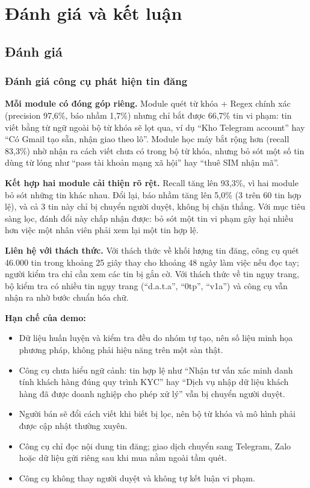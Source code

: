 \section{Đánh giá và kết luận}\label{sec:6}

\subsection{Đánh giá}\label{sec:6.1}

\subsubsection{Đánh giá công cụ phát hiện tin đăng}\label{sec:6.1.1}

\textbf{Mỗi module có đóng góp riêng.} Module quét từ khóa + Regex chính xác (precision 97,6\%, báo nhầm 1,7\%) nhưng chỉ bắt được 66,7\% tin vi phạm: tin viết bằng từ ngữ ngoài bộ từ khóa sẽ lọt qua, ví dụ “Kho Telegram account” hay “Có Gmail tạo sẵn, nhận giao theo lô”. Module học máy bắt rộng hơn (recall 83,3\%) nhờ nhận ra cách viết chưa có trong bộ từ khóa, nhưng bỏ sót một số tin dùng từ lóng như “pass tài khoản mạng xã hội” hay “thuê SIM nhận mã”.

\textbf{Kết hợp hai module cải thiện rõ rệt.} Recall tăng lên 93,3\%, vì hai module bỏ sót những tin khác nhau. Đổi lại, báo nhầm tăng lên 5,0\% (3 trên 60 tin hợp lệ), và cả 3 tin này chỉ bị chuyển người duyệt, không bị chặn thẳng. Với mục tiêu sàng lọc, đánh đổi này chấp nhận được: bỏ sót một tin vi phạm gây hại nhiều hơn việc một nhân viên phải xem lại một tin hợp lệ.

\textbf{Liên hệ với thách thức.} Với thách thức về khối lượng tin đăng, công cụ quét 46.000 tin trong khoảng 25 giây thay cho khoảng 48 ngày làm việc nếu đọc tay; người kiểm tra chỉ cần xem các tin bị gắn cờ. Với thách thức về tin ngụy trang, bộ kiểm tra có nhiều tin ngụy trang (“d.a.t.a”, “0tp”, “v1a”) và công cụ vẫn nhận ra nhờ bước chuẩn hóa chữ.

\textbf{Hạn chế của demo:}

\begin{itemize}
\item Dữ liệu huấn luyện và kiểm tra đều do nhóm tự tạo, nên số liệu minh họa phương pháp, không phải hiệu năng trên một sàn thật.
\item Công cụ chưa hiểu ngữ cảnh: tin hợp lệ như “Nhận tư vấn xác minh danh tính khách hàng đúng quy trình KYC” hay “Dịch vụ nhập dữ liệu khách hàng đã được doanh nghiệp cho phép xử lý” vẫn bị chuyển người duyệt.
\item Người bán sẽ đổi cách viết khi biết bị lọc, nên bộ từ khóa và mô hình phải được cập nhật thường xuyên.
\item Công cụ chỉ đọc nội dung tin đăng; giao dịch chuyển sang Telegram, Zalo hoặc dữ liệu gửi riêng sau khi mua nằm ngoài tầm quét.
\item Công cụ không thay người duyệt và không tự kết luận vi phạm.
\end{itemize}

